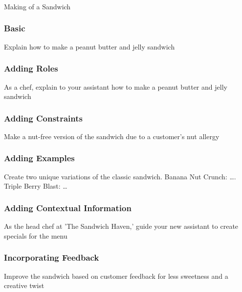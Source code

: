 \begin{frame}[fragile]\frametitle{}
\begin{center}
{\Large Making of a Sandwich}
\end{center}
\end{frame}

\begin{frame}[fragile]\frametitle{Basic}

Explain how to make a peanut butter and jelly sandwich

\end{frame}

\begin{frame}[fragile]\frametitle{Adding Roles}

As a chef, explain to your assistant how to make a peanut butter and jelly sandwich

\end{frame}

\begin{frame}[fragile]\frametitle{Adding Constraints}

Make a nut-free version of the sandwich due to a customer's nut allergy

\end{frame}


\begin{frame}[fragile]\frametitle{Adding Examples}

Create two unique variations of the classic sandwich. Banana Nut Crunch: \ldots. Triple Berry Blast: \ldots 

\end{frame}

\begin{frame}[fragile]\frametitle{Adding Contextual Information}

As the head chef at 'The Sandwich Haven,' guide your new assistant to create specials for the menu

\end{frame}

\begin{frame}[fragile]\frametitle{Incorporating Feedback}

Improve the sandwich based on customer feedback for less sweetness and a creative twist

\end{frame}


